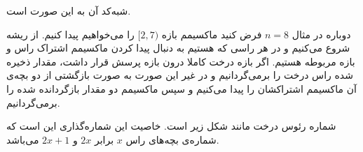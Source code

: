\begin{problem}
شبه‌کد آن به این صورت است.


دوباره 
در مثال
$n = 8$
فرض کنید ماکسیمم بازه
$[2, 7)$
را می‌خواهیم پیدا کنیم. از ریشه شروع می‌کنیم و در هر راسی که هستیم به دنبال پیدا کردن
ماکسیمم اشتراک راس و بازه مربوطه هستیم.
اگر بازه درخت کاملا درون بازه پرسش قرار داشت، مقدار ذخیره شده راس درخت را برمی‌گردانیم و 
در غیر این صورت به صورت بازگشتی از دو بچه‌ی آن ماکسیمم اشتراکشان را پیدا می‌کنیم و سپس ماکسیمم دو مقدار بازگردانده شده را برمی‌گردانیم.





شماره رئوس درخت مانند شکل زیر است. خاصیت این شماره‌گذاری این است که شماره‌ی بچه‌های راس 
$x$
برابر
$2x$
و
$2x + 1$
می‌باشد.




\end{problem}